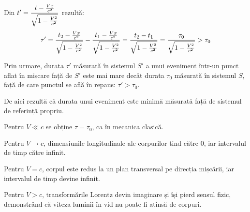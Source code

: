 Din \( t' = \dfrac{t - \frac{Vx}{c^2}}{\sqrt{1 - \frac{V^2}{c^2}}} \) rezultă:
\[
    \tau'
    = \frac{t_2 - \frac{Vx}{c^2}}{\sqrt{1 - \frac{V^2}{c^2}}}
    - \frac{t_1 - \frac{Vx}{c^2}}{\sqrt{1 - \frac{V^2}{c^2}}}
    = \frac{t_2 - t_1}{\sqrt{1 - \frac{V^2}{c^2}}} = \frac{\tau_0}{\sqrt{1 - \frac{V^2}{c^2}}} > \tau_0
\]

Prin urmare, durata $\tau'$ măsurată în sistemul $S'$ a unui eveniment într-un
punct aflat în mișcare față de $S'$ este mai mare decât durata $\tau_0$
măsurată în sistemul $S$, față de care punctul se află în repaus:
\( \tau' > \tau_0 \).

De aici rezultă că durata unui eveniment este minimă măsurată față de sistemul
de referință propriu.

\parbreak

%
%
%
%

Pentru \( V \ll c \) se obține \( \tau = \tau_0 \), ca în mecanica clasică.

Pentru \( V \rightarrow c \), dimensiunile longitudinale ale corpurilor tind
către 0, iar intervalul de timp către infinit.

Pentru \( V = c \), corpul este redus la un plan transversal pe direcția
mișcării, iar intervalul de timp devine infinit.

Pentru \( V > c \), transformările Lorentz devin imaginare și își pierd
sensul fizic, demonstrând că viteza luminii în vid nu poate fi atinsă de
corpuri.

